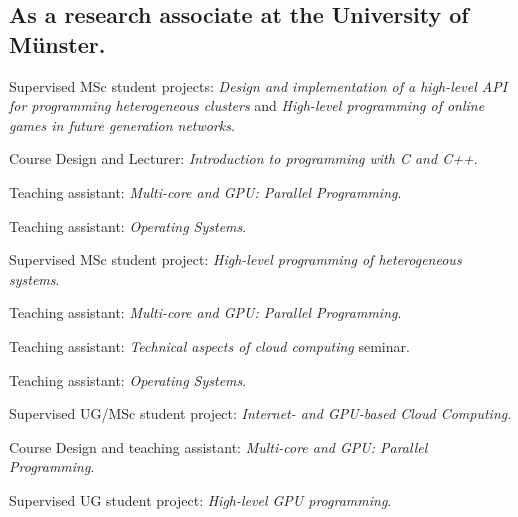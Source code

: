 \subsection{As a research associate at the University of Münster.}

\begin{cvitemize}[2013 - 2014]
  \item Supervised MSc student projects:
        \emph{Design and implementation of a high-level API for programming heterogeneous clusters} and \emph{High-level programming of online games in future generation networks}.
\end{cvitemize}

\begin{cvitemize}[2012 - 2013]
    \item  Course Design and Lecturer:
        \emph{Introduction to programming with C and C++}.
      \item    Teaching assistant:
        \emph{Multi-core and GPU\@: Parallel Programming}.
    \item Teaching assistant:
        \emph{Operating Systems}.
\end{cvitemize}

\begin{cvitemize}[2011 - 2012]
    \item Supervised MSc student project:
        \emph{High-level programming of heterogeneous systems}.
      \item Teaching assistant:
        \emph{Multi-core and GPU\@: Parallel Programming}.
    \item Teaching assistant:
        \emph{Technical aspects of cloud computing} seminar.
      \item Teaching assistant:
        \emph{Operating Systems}.
\end{cvitemize}

\begin{cvitemize}[2010 - 2011]
    \item Supervised UG/MSc student project:
        \emph{Internet- and GPU-based Cloud Computing}.
      \item Course Design and teaching assistant:
        \emph{Multi-core and GPU\@: Parallel Programming}.
    \item Supervised UG student project:
        \emph{High-level GPU programming}.
\end{cvitemize}